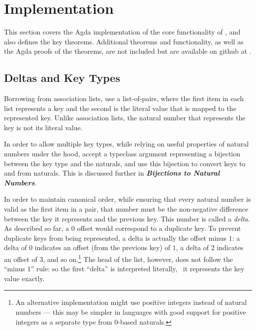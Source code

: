 \section{Implementation}
\label{sec:DD}



This section covers the Agda implementation of the core functionality of \dds, and also defines the key theorems. Additional theorems and functionality, as well as the Agda proofs of the theorems, are not included but are available on github at \citep{github:agda}.

\subsection{Deltas and Key Types}

Borrowing from association lists, \dds{} use a list-of-pairs, where the first item in each list represents a key and the second is the literal value that is mapped to the represented key.
%
Unlike association lists, the natural number that represents the key is not its literal value.

In order to allow multiple key types, while relying on useful properties of natural numbers under the hood, \dds{} accept a typeclass argument representing a bijection
%
between the key type and the naturals, and use this bijection to convert keys to and from naturals. This is discussed further in \emph{\textbf{Bijections to Natural Numbers}}.

In order to maintain canonical order, while ensuring that every natural number is valid as the first item in a pair, that number must be the non-negative difference between the key it represents and the previous key.
%
This number is called a \emph{delta}. %
%
As described so far, a $0$ offset would correspond to a duplicate key.
%
To prevent duplicate keys from being represented, a delta is actually the offset minus $1$: a delta of $0$ indicates an offset (from the previous key) of $1$, a delta of $2$ indicates an offset of $3$, and so on.\footnote{
An alternative implementation might use positive integers instead of natural numbers ---
%
this may be simpler in languages with good support for positive integers as a separate type from 0-based naturals.
}
%
The head of the list, however, does not follow the ``minus $1$'' rule: so the first ``delta'' is interpreted literally, \ie{}~it represents the key value exactly.

